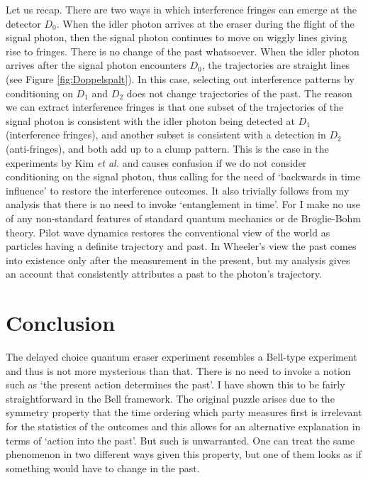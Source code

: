 \documentclass[12pt]{article}
\numberwithin{equation}{section}
\begin{document}
Let us recap. There are two ways in which interference fringes can emerge at the detector $D_0$. When the idler photon arrives at the eraser during the flight of the signal photon, then the signal photon continues to move on wiggly lines giving rise to fringes. There is no change of the past whatsoever. When the idler photon arrives after the signal photon encounters $D_0$, the trajectories are straight lines (see Figure \ref{fig:Doppelspalt}). In this case, selecting out interference patterns by conditioning on $D_1$ and $D_2$ does not change trajectories of the past. The reason we can extract interference fringes is that one subset of the trajectories of the signal photon is consistent with the idler photon being detected at $D_1$ (interference fringes), and another subset is consistent with a detection in $D_2$ (anti-fringes), and both add up to a clump pattern. This is the case in the experiments by Kim \textit{et al.} and causes confusion if we do not consider conditioning on the signal photon, thus calling for the need of `backwards in time influence' to restore the interference outcomes. It also trivially follows from my analysis that there is no need to invoke `entanglement in time'. For I make no use of any non-standard features of standard quantum mechanics or de Broglie-Bohm theory. Pilot wave dynamics restores the conventional view of the world as particles having a definite trajectory and past. In Wheeler's view the past comes into existence only after the measurement in the present, but my analysis gives an account that consistently attributes a past to the photon's trajectory. 




\section{Conclusion}

The delayed choice quantum eraser experiment resembles a Bell-type experiment and thus is not more mysterious than that. 
There is no need to invoke a notion such as `the present action determines the past'. I have shown this to be fairly straightforward in the Bell framework. The original puzzle arises due to the symmetry property that the time ordering which party measures first is irrelevant for the statistics of the outcomes and this allows for an alternative explanation in terms of `action into the past'. But such is unwarranted. One can treat the same phenomenon in two different ways given this property, but one of them  looks as if something would have to change in the past.  
\end{document}
